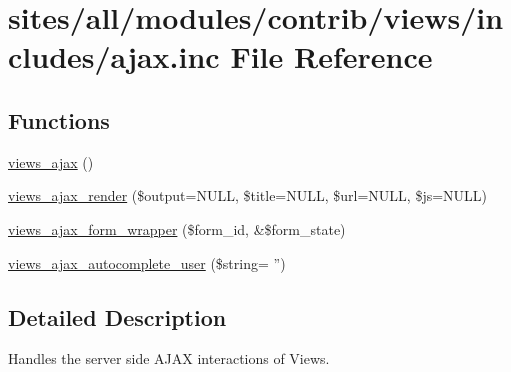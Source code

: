 \hypertarget{ajax_8inc}{
\section{sites/all/modules/contrib/views/includes/ajax.inc File Reference}
\label{ajax_8inc}
}
\subsection*{Functions}
\begin{CompactItemize}
\item 
\hyperlink{group__ajax_g5f1adff7f07ea45d8ab62b456ffdd6e0}{views\_\-ajax} ()
\item 
\hyperlink{group__ajax_gb8d3fb5832b13ebecfc2367a923ea01d}{views\_\-ajax\_\-render} (\$output=NULL, \$title=NULL, \$url=NULL, \$js=NULL)
\item 
\hyperlink{group__ajax_g7eed0d665d7b4c8c8134eb060afbb2be}{views\_\-ajax\_\-form\_\-wrapper} (\$form\_\-id, \&\$form\_\-state)
\item 
\hyperlink{group__ajax_g0d9404f1a04f9f5102ffac0bef92d5ab}{views\_\-ajax\_\-autocomplete\_\-user} (\$string= '')
\end{CompactItemize}


\subsection{Detailed Description}
Handles the server side AJAX interactions of Views. 